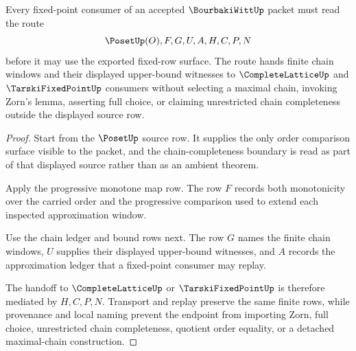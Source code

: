 \begin{theorem}
\label{thm:bourbaki-witt-chain-handoff}
Every fixed-point consumer of an accepted $\BourbakiWittUp$ packet must read the route
$$
\PosetUp(O),F,G,U,A,H,C,P,N
$$
before it may use the exported fixed-row surface. The route hands finite chain windows and their displayed upper-bound witnesses to $\CompleteLatticeUp$ and $\TarskiFixedPointUp$ consumers without selecting a maximal chain, invoking Zorn's lemma, asserting full choice, or claiming unrestricted chain completeness outside the displayed source row.
\end{theorem}
\begin{proof}
Start from the $\PosetUp$ source row. It supplies the only order comparison surface visible to the packet, and the chain-completeness boundary is read as part of that displayed source rather than as an ambient theorem.

Apply the progressive monotone map row. The row $F$ records both monotonicity over the carried order and the progressive comparison used to extend each inspected approximation window.

Use the chain ledger and bound rows next. The row $G$ names the finite chain windows, $U$ supplies their displayed upper-bound witnesses, and $A$ records the approximation ledger that a fixed-point consumer may replay.

The handoff to $\CompleteLatticeUp$ or $\TarskiFixedPointUp$ is therefore mediated by $H,C,P,N$. Transport and replay preserve the same finite rows, while provenance and local naming prevent the endpoint from importing Zorn, full choice, unrestricted chain completeness, quotient order equality, or a detached maximal-chain construction.
\end{proof}



